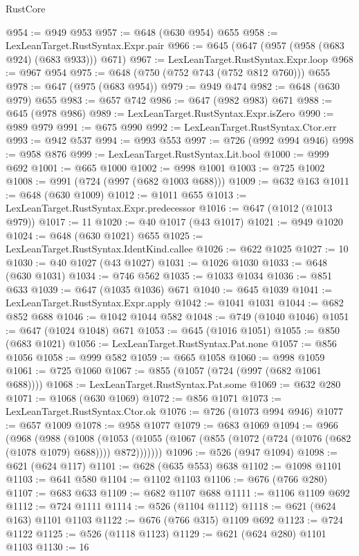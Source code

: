 \begin{lexlean}{RustCore}
\begin{coremodule}
@954 := @949 @953
@957 := @648 (@630 @954) @655
@958 := LexLeanTarget.RustSyntax.Expr.pair
@966 := @645 (@647 (@957 (@958 (@683 @924) (@683 @933))) @671)
@967 := LexLeanTarget.RustSyntax.Expr.loop
@968 := @967 @954
@975 := @648 (@750 (@752 @743 (@752 @812 @760))) @655
@978 := @647 (@975 (@683 @954))
@979 := @949 @474
@982 := @648 (@630 @979) @655
@983 := @657 @742
@986 := @647 (@982 @983) @671
@988 := @645 (@978 @986)
@989 := LexLeanTarget.RustSyntax.Expr.isZero
@990 := @989 @979
@991 := @675 @990
@992 := LexLeanTarget.RustSyntax.Ctor.err
@993 := @942 @537
@994 := @993 @553
@997 := @726 (@992 @994 @946)
@998 := @958 @876
@999 := LexLeanTarget.RustSyntax.Lit.bool
@1000 := @999 @692
@1001 := @665 @1000
@1002 := @998 @1001
@1003 := @725 @1002
@1008 := @991 (@724 (@997 (@682 @1003 @688)))
@1009 := @632 @163
@1011 := @648 (@630 @1009)
@1012 := @1011 @655
@1013 := LexLeanTarget.RustSyntax.Expr.predecessor
@1016 := @647 (@1012 (@1013 @979))
@1017 := 11
@1020 := @40 @1017 (@43 @1017)
@1021 := @949 @1020
@1024 := @648 (@630 @1021) @655
@1025 := LexLeanTarget.RustSyntax.IdentKind.callee
@1026 := @622 @1025
@1027 := 10
@1030 := @40 @1027 (@43 @1027)
@1031 := @1026 @1030
@1033 := @648 (@630 @1031)
@1034 := @746 @562
@1035 := @1033 @1034
@1036 := @851 @633
@1039 := @647 (@1035 @1036) @671
@1040 := @645 @1039
@1041 := LexLeanTarget.RustSyntax.Expr.apply
@1042 := @1041 @1031
@1044 := @682 @852 @688
@1046 := @1042 @1044 @582
@1048 := @749 (@1040 @1046)
@1051 := @647 (@1024 @1048) @671
@1053 := @645 (@1016 @1051)
@1055 := @850 (@683 @1021)
@1056 := LexLeanTarget.RustSyntax.Pat.none
@1057 := @856 @1056
@1058 := @999 @582
@1059 := @665 @1058
@1060 := @998 @1059
@1061 := @725 @1060
@1067 := @855 (@1057 (@724 (@997 (@682 @1061 @688))))
@1068 := LexLeanTarget.RustSyntax.Pat.some
@1069 := @632 @280
@1071 := @1068 (@630 @1069)
@1072 := @856 @1071
@1073 := LexLeanTarget.RustSyntax.Ctor.ok
@1076 := @726 (@1073 @994 @946)
@1077 := @657 @1009
@1078 := @958 @1077
@1079 := @683 @1069
@1094 := @966
    (@968
      (@988
        (@1008
          (@1053 (@1055 (@1067 (@855 (@1072 (@724 (@1076 (@682 (@1078 @1079) @688)))) @872)))))))
@1096 := @526 (@947 @1094)
@1098 := @621 (@624 @117)
@1101 := @628 (@635 @553) @638
@1102 := @1098 @1101
@1103 := @641 @580
@1104 := @1102 @1103
@1106 := @676 (@766 @280)
@1107 := @683 @633
@1109 := @682 @1107 @688
@1111 := @1106 @1109 @692
@1112 := @724 @1111
@1114 := @526 (@1104 @1112)
@1118 := @621 (@624 @163) @1101 @1103
@1122 := @676 (@766 @315) @1109 @692
@1123 := @724 @1122
@1125 := @526 (@1118 @1123)
@1129 := @621 (@624 @280) @1101 @1103
@1130 := 16

\end{coremodule}
\end{lexlean}
